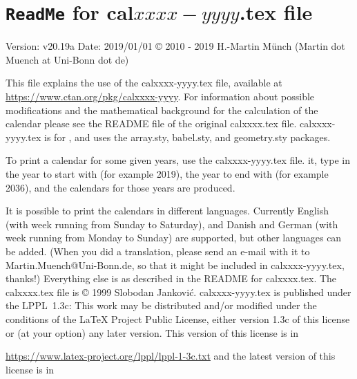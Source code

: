 \documentclass{article}
\begin{document}
\section*{\texttt{ReadMe} for cal$xxxx-yyyy$.tex file}
Version: v20.19a\newline
Date: 2019/01/01\newline
\copyright{} 2010 - 2019 H.-Martin M\"{u}nch (Martin dot Muench at Uni-Bonn dot de)\newline

\noindent This file explains the use of the \textsf{calxxxx-yyyy.tex} file,
available at\newline
\url{https://www.ctan.org/pkg/calxxxx-yyyy}.\newline
\noindent For information about possible modifications and the mathematical background
for the calculation of the calendar please see the README file of the original
\textsf{calxxxx.tex} file. \textsf{calxxxx-yyyy.tex} is for \LaTeXe, and uses
the \textsf{array.sty}, \textsf{babel.sty}, and \textsf{geometry.sty} packages.

\hspace*{-1.98471pt}To print a calendar for some given years,
use the \textsf{calxxxx-yyyy.tex} file. \LaTeXe{} it, type in the year to start with
(for example 2019), the year to end with (for example 2036), and the calendars
for those years are produced.

It is possible to print the calendars in different languages. Currently
English (with week running from Sunday to Saturday),
and Danish and German (with week running from Monday to Sunday) are supported,
but other languages can be added. (When you did a translation, please send
an e-mail with it to {\nolinebreak Martin.Muench@Uni-Bonn.de,}
so that it might be included in \textsf{calxxxx-yyyy.tex}, thanks!)\newline
Everything else is as described in the README for \textsf{calxxxx.tex}.\newline
The \textsf{calxxxx.tex} file is \copyright{} 1999 Slobodan Jankovi\'{c}.\newline
\textsf{calxxxx-yyyy.tex} is published under the LPPL~1.3c: This work may be
distributed and/or modified under the conditions of the \LaTeX{} Project
Public License, either version 1.3c of this license or (at your option) any
later version. This version of this license is in

\url{https://www.latex-project.org/lppl/lppl-1-3c.txt}\newline
and the latest version of this license is in
\end{document}
